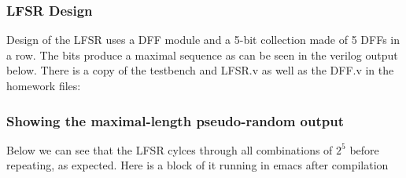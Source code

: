 \documentclass[a4paper,11pt]{exam}
\begin{document}
\subsubsection{LFSR Design}
\label{sec:orge378653}
Design of the LFSR uses a DFF module and a 5-bit collection made of 5 DFFs in a row. The bits produce a maximal sequence as can be seen in the verilog output below. There is a copy of the testbench and LFSR.v as well as the DFF.v in the homework files:
\subsubsection{Showing the maximal-length pseudo-random output}
\label{sec:org2774d12}
Below we can see that the LFSR cylces through all combinations of \(2^5\) before repeating, as expected. Here is a block of it running in emacs after compilation
\end{document}
